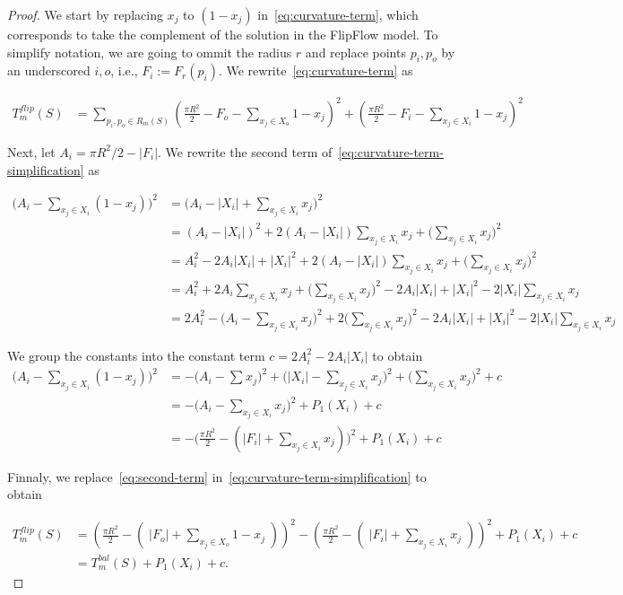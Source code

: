 \begin{proof}

We start by replacing $x_j$ to $(1-x_j)$ in~\cref{eq:curvature-term}, which corresponds to take the complement of the solution in the FlipFlow model. To simplify notation, we are going to ommit the radius $r$ and replace points $p_i,p_o$ by an underscored $i,o$, i.e., $F_i := F_r(p_i)$. We rewrite~\cref{eq:curvature-term} as

\begin{align}
T_{m}^{flip}(S) &= \sum_{ p_i,p_o \in R_m(S)}{ ( \frac{\pi R^2}{2} - F_o - \sum_{x_j \in X_o}{1-x_j})^2 + (\frac{\pi R^2}{2} - F_i - \sum_{x_j \in X_i}{1-x_j})^2 }
\label{eq:curvature-term-simplification}
\end{align}

Next, let $A_i = \pi R^2/2 - |F_i|$. We rewrite  the second term of~\cref{eq:curvature-term-simplification} as

\begin{align*}
	\Big(A_i - \sum_{x_j \in X_i}{ (1-x_j) } \Big)^2 &= \Big( A_i - |X_i| + \sum_{x_j \in X_i}{ x_j } \Big)^2 \\
	&= (A_i - |X_i|)^2 + 2(A_i - |X_i|)\sum_{x_j \in X_i}{x_j} + \Big( \sum_{x_j \in X_i}{x_j} \Big)^2\\	
	&= A_i^2 -2A_i|X_i| + |X_i|^2 + 2(A_i - |X_i|)\sum_{x_j \in X_i}{x_j} + \Big( \sum_{x_j \in X_i}{x_j} \Big)^2\\
	&= A_i^2 + 2A_i\sum_{x_j \in X_i}{x_j} + \Big( \sum_{x_j \in X_i}{x_j} \Big)^2 - 2A_i|X_i| + |X_i|^2 -2|X_i|\sum_{x_j \in X_i}{x_j} \\
	&= 2A_i^2 - \Big(A_i - \sum_{x_j \in X_i}{x_j}\Big)^2 + 2\Big( \sum_{x_j \in X_i}{x_j} \Big) ^2 - 2A_i|X_i| + |X_i|^2 - 2|X_i|\sum_{x_j \in X_i}{x_j}
\end{align*}

	We group the constants into the constant term $c=2A_i^2 - 2A_i|X_i|$	 to obtain
\begin{align}
		\Big(A_i - \sum_{x_j \in X_i}{ (1-x_j) }\Big)^2 &= - \Big(A_i - \sum_{}{x_j}\Big)^2 + \Big(|X_i| - \sum_{x_j \in X_i}{x_j}\Big)^2 + \Big(\sum_{x_j \in X_i}{x_j}\Big)^2 + c \nonumber \\
	&= - \Big(A_i - \sum_{x_j \in X_i}{x_j}\Big)^2 + P_1(X_i) + c \nonumber \\
	&= - \Big(\frac{\pi R^2}{2} - (|F_i| + \sum_{x_j \in X_i}{x_j}) \Big)^2 + P_1(X_i) + c \nonumber 	
	\label{eq:second-term}
\end{align}

Finnaly, we  replace~\cref{eq:second-term} in~\cref{eq:curvature-term-simplification} to obtain

\begin{align}
T_{m}^{flip}(S) &= ( \frac{\pi R^2}{2} - (\; |F_o| + \sum_{ x_j \in X_o}{1-x_j} \; ) )^2 -(\frac{\pi R^2}{2} - (\; |F_i| + \sum_{x_j \in X_i}{x_j}\;))^2  + P_1(X_i) + c \nonumber \\
&= T_{m}^{bal}(S) + P_1(X_i) + c.
\end{align}

\end{proof}

